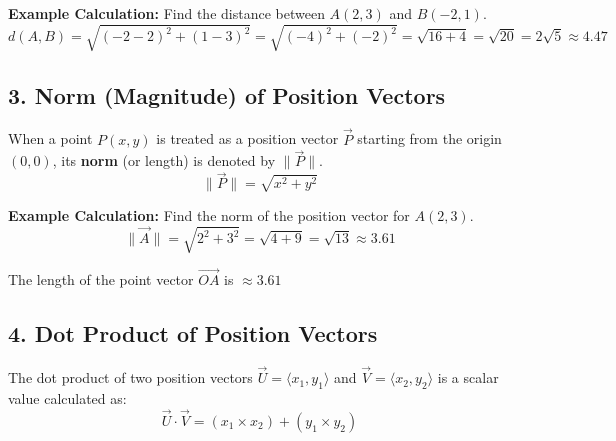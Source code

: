 \documentclass[11pt]{article}
\begin{document}
\textbf{Example Calculation:} Find the distance between $A(2,3)$ and $B(-2,1)$.
\[ d(A,B) = \sqrt{(-2 - 2)^2 + (1 - 3)^2} = \sqrt{(-4)^2 + (-2)^2} = \sqrt{16 + 4} = \sqrt{20} = 2\sqrt{5} \approx 4.47 \]

\subsection*{3. Norm (Magnitude) of Position Vectors}
When a point $P(x,y)$ is treated as a position vector $\vec{P}$ starting from the origin $(0,0)$, its \textbf{norm} (or length) is denoted by $\|\vec{P}\|$.
\[ \|\vec{P}\| = \sqrt{x^2 + y^2} \]

\textbf{Example Calculation:} Find the norm of the position vector for $A(2,3)$.
\[ \|\vec{A}\| = \sqrt{2^2 + 3^2} = \sqrt{4 + 9} = \sqrt{13} \approx 3.61 \]

\begin{center}
\end{center}
The length of the point vector $\vec{OA}$ is $\approx 3.61$

\subsection*{4. Dot Product of Position Vectors}
The dot product of two position vectors $\vec{U} = \langle x_1, y_1 \rangle$ and $\vec{V} = \langle x_2, y_2 \rangle$ is a scalar value calculated as:
\[ \vec{U} \cdot \vec{V} = (x_1 \times x_2) + (y_1 \times y_2) \]
\end{document}
